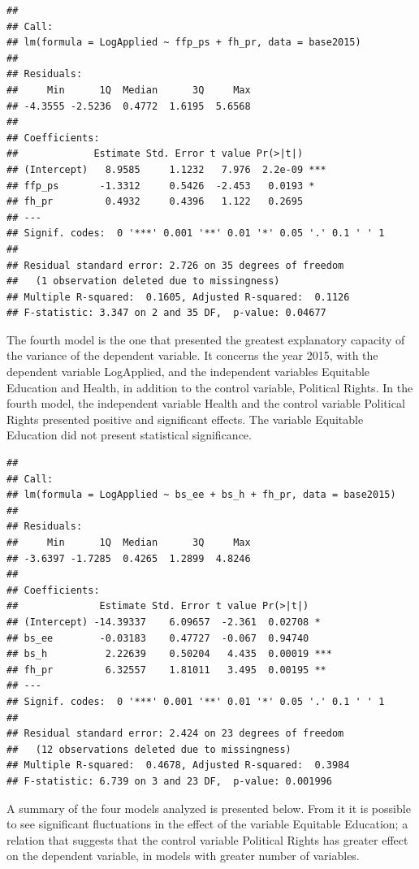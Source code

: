 \documentclass[]{elsarticle} %
\begin{document}
\begin{verbatim}
## 
## Call:
## lm(formula = LogApplied ~ ffp_ps + fh_pr, data = base2015)
## 
## Residuals:
##     Min      1Q  Median      3Q     Max 
## -4.3555 -2.5236  0.4772  1.6195  5.6568 
## 
## Coefficients:
##             Estimate Std. Error t value Pr(>|t|)    
## (Intercept)   8.9585     1.1232   7.976  2.2e-09 ***
## ffp_ps       -1.3312     0.5426  -2.453   0.0193 *  
## fh_pr         0.4932     0.4396   1.122   0.2695    
## ---
## Signif. codes:  0 '***' 0.001 '**' 0.01 '*' 0.05 '.' 0.1 ' ' 1
## 
## Residual standard error: 2.726 on 35 degrees of freedom
##   (1 observation deleted due to missingness)
## Multiple R-squared:  0.1605, Adjusted R-squared:  0.1126 
## F-statistic: 3.347 on 2 and 35 DF,  p-value: 0.04677
\end{verbatim}

The fourth model is the one that presented the greatest explanatory
capacity of the variance of the dependent variable. It concerns the year
2015, with the dependent variable LogApplied, and the independent
variables Equitable Education and Health, in addition to the control
variable, Political Rights. In the fourth model, the independent
variable Health and the control variable Political Rights presented
positive and significant effects. The variable Equitable Education did
not present statistical significance.

\begin{verbatim}
## 
## Call:
## lm(formula = LogApplied ~ bs_ee + bs_h + fh_pr, data = base2015)
## 
## Residuals:
##     Min      1Q  Median      3Q     Max 
## -3.6397 -1.7285  0.4265  1.2899  4.8246 
## 
## Coefficients:
##              Estimate Std. Error t value Pr(>|t|)    
## (Intercept) -14.39337    6.09657  -2.361  0.02708 *  
## bs_ee        -0.03183    0.47727  -0.067  0.94740    
## bs_h          2.22639    0.50204   4.435  0.00019 ***
## fh_pr         6.32557    1.81011   3.495  0.00195 ** 
## ---
## Signif. codes:  0 '***' 0.001 '**' 0.01 '*' 0.05 '.' 0.1 ' ' 1
## 
## Residual standard error: 2.424 on 23 degrees of freedom
##   (12 observations deleted due to missingness)
## Multiple R-squared:  0.4678, Adjusted R-squared:  0.3984 
## F-statistic: 6.739 on 3 and 23 DF,  p-value: 0.001996
\end{verbatim}

A summary of the four models analyzed is presented below. From it it is
possible to see significant fluctuations in the effect of the variable
Equitable Education; a relation that suggests that the control variable
Political Rights has greater effect on the dependent variable, in models
with greater number of variables.
\end{document}

